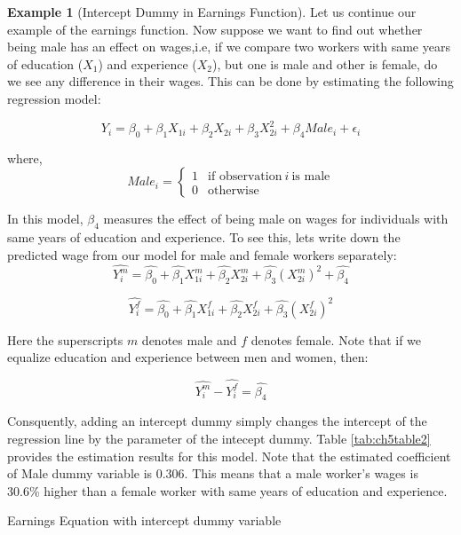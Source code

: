 \documentclass[
]{book}
\theoremstyle{definition}
\theoremstyle{definition}
\newtheorem{example}{Example}[chapter]
\theoremstyle{definition}
\theoremstyle{definition}
\theoremstyle{remark}
\begin{document}
\begin{example}[Intercept Dummy in Earnings Function]
\protect\hypertarget{exm:unnamed-chunk-27}{}\label{exm:unnamed-chunk-27}Let us continue our example of the earnings function. Now suppose we want to find out whether being male has an effect on wages,i.e, if we compare two workers with same years of education (\(X_{1}\)) and experience (\(X_2\)), but one is male and other is female, do we see any difference in their wages. This can be done by estimating the following regression model:

\[Y_i= \beta_0 + \beta_1 X_{1i} + \beta_2 X_{2i} + \beta_3 X_{2i}^2 + \beta_4 Male_i+ \epsilon_i\]

where, \[Male_i= \begin{cases}
1 & \text{if observation} \ i \ \text{is male} \\
0 & \text{otherwise}
\end{cases}\]

In this model, \(\beta_4\) measures the effect of being male on wages for individuals with same years of education and experience. To see this, lets write down the predicted wage from our model for male and female workers separately:\[\widehat{Y^m_i}=\widehat{\beta_0} + \widehat{\beta_1} X^m_{1i} + \widehat{\beta_2} X^m_{2i} + \widehat{\beta_3} (X^m_{2i})^2 + \widehat{\beta_4}\]

\[\widehat{Y^f_i}= \widehat{\beta_0} + \widehat{\beta_1} X^f_{1i} + \widehat{\beta_2} X^f_{2i} + \widehat{\beta_3} (X^f_{2i})^2\]

Here the superscripts \(m\) denotes male and \(f\) denotes female. Note that if we equalize education and experience between men and women, then:

\[\widehat{Y^m_i}-\widehat{Y^f_i}=\widehat{\beta_4}\]

Consquently, adding an intercept dummy simply changes the intercept of the regression line by the parameter of the intecept dummy. Table \ref{tab:ch5table2} provides the estimation results for this model. Note that the estimated coefficient of Male dummy variable is 0.306. This means that a male worker's wages is 30.6\% higher than a female worker with same years of education and experience.
\end{example}

\label{tab:ch5table2} Earnings Equation with intercept dummy variable
\end{document}
